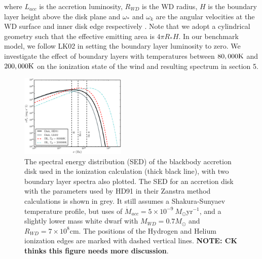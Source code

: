 \documentclass[preprint, a4paper, 11pt]{aastex}
\begin{document}
where $L_{acc}$ is the accretion luminosity, $R_{WD}$ is the WD radius, $H$ is the boundary layer height
above the disk plane
and $\omega_*$ and $\omega_k$ are the angular velocities at the WD surface and inner disk edge respectively
\citep{fkrbook}. Note that we adopt a cylindrical geometry such that the effective emitting
area is $4 \pi R_* H$. 
In our benchmark model, we follow LK02 in setting the boundary layer
luminosity to zero. We investigate the effect
of boundary layers with temperatures between $80,000{\rm K}$ and $200,000{\rm K}$ 
on the ionization state of the wind and resulting
spectrum in section 5.


\begin{figure}
\centering
\includegraphics[width=0.45\textwidth]{figures/sed_figure.eps}
\caption{
The spectral energy distribution (SED) of the blackbody accretion
disk used in the ionization calculation (thick black line), 
with two boundary layer spectra also plotted.
The SED for an accretion disk
with the parameters used by HD91 in their Zanstra method calculations is shown in grey. 
It still assumes a Shakura-Sunyaev temperature profile, but uses
of $\dot{M}_{acc}= 5\times10^{-9}~M_{\odot}$yr$^{-1}$, and a slightly lower mass
white dwarf with $M_{WD}=0.7 M_{\odot}$ and $R_{WD} = 7\times10^{8}$cm.
The positions of the Hydrogen and Helium ionization edges 
are marked with dashed vertical lines.
{\bf NOTE: CK thinks this figure needs more discussion}.
}
\label{sed}
\end{figure}


%



%
\end{document}

